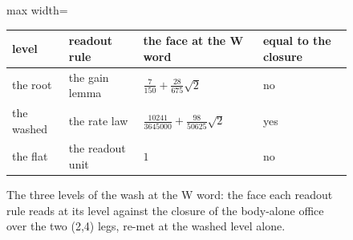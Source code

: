 \begin{figure}[h]\centering
\begin{adjustbox}{max width=\linewidth}\begin{tabular}{llll}\toprule
level & readout rule & the face at the W word & equal to the closure \\ \midrule
the root & the gain lemma & $\tfrac{7}{150} + \tfrac{28}{675}\sqrt{2}$ & no \\
the washed & the rate law & $\tfrac{10241}{3645000} + \tfrac{98}{50625}\sqrt{2}$ & yes \\
the flat & the readout unit & $1$ & no \\ \bottomrule
\end{tabular}\end{adjustbox}
\caption{The three levels of the wash at the W word: the face each readout rule reads at its level against the closure of the body-alone office over the two (2,4) legs, re-met at the washed level alone.}
\end{figure}
\par\medskip{}\label{narr:close:1-1}\par
